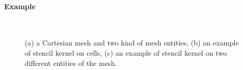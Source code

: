 \paragraph{\textbf{Example}}
\begin{figure}[ht]
\begin{center}
\\
\hspace{10pt}
\vspace{20pt}
\end{center}
\caption{(a) a Cartesian mesh and two kind of mesh entities, (b) an example of stencil kernel on cells, (c) an example of stencil kernel on two different entities of the mesh.}
\label{fig:gspmsp}
\end{figure}
